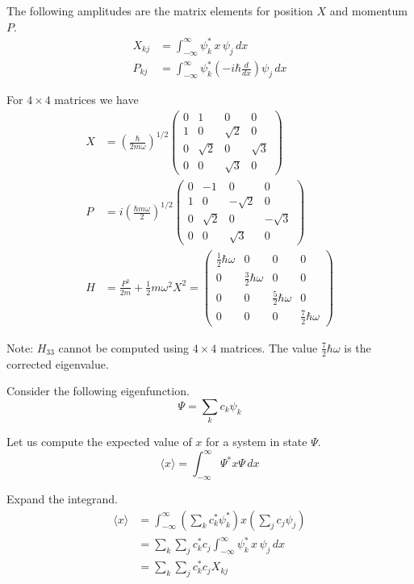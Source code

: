 \documentclass[12pt]{article}
\begin{document}
\noindent
The following amplitudes are the matrix elements for position $X$ and momentum $P$.
\begin{align*}
X_{kj}&=\int_{-\infty}^\infty \psi_k^*\,x\,\psi_j\,dx
\\[1ex]
P_{kj}&=\int_{-\infty}^\infty \psi_k^*\left(-i\hbar\frac{d}{dx}\right)\psi_j\,dx
\end{align*}

\noindent
For $4\times4$ matrices we have
\begin{align*}
X&=\left(\frac{\hbar}{2m\omega}\right)^{1/2}
\begin{pmatrix}
0 & 1 & 0 & 0
\\
1 & 0 & \sqrt{2} & 0
\\
0 & \sqrt{2} & 0 & \sqrt{3}
\\
0 & 0 & \sqrt{3} & 0
\end{pmatrix}
\\[1ex]
P&=i\left(\frac{\hbar m\omega}{2}\right)^{1/2}
\begin{pmatrix}
0 & -1 & 0 & 0
\\
1 & 0 & -\sqrt{2} & 0
\\
0 & \sqrt{2} & 0 & -\sqrt{3}
\\
0 & 0 & \sqrt{3} & 0
\end{pmatrix}
\\[1ex]
H&=\frac{P^2}{2m}+\frac{1}{2}m\omega^2 X^2
=\begin{pmatrix}
\tfrac{1}{2}\hbar\omega & 0 & 0 & 0
\\
0 & \tfrac{3}{2}\hbar\omega & 0 & 0
\\
0 & 0 & \tfrac{5}{2}\hbar\omega & 0
\\
0 & 0 & 0 & \tfrac{7}{2}\hbar\omega
\end{pmatrix}
\end{align*}

\noindent
Note: $H_{33}$ cannot be computed using $4\times4$ matrices.
The value $\tfrac{7}{2}\hbar\omega$ is the corrected eigenvalue.

\bigskip
\noindent
Consider the following eigenfunction.
\begin{equation*}
\Psi=\sum_k c_k\psi_k
\end{equation*}

\noindent
Let us compute the expected value of $x$ for a system in state $\Psi$.
\begin{equation*}
\langle x\rangle=\int_{-\infty}^\infty \Psi^* x\Psi\,dx
\end{equation*}

\noindent
Expand the integrand.
\begin{align*}
\langle x\rangle
&=\int_{-\infty}^\infty
\left(\sum_kc_k^*\psi_k^*\right) x \left(\sum_j c_j\psi_j\right)
\\
&=\sum_k\sum_jc_k^*c_j\int_{-\infty}^\infty\psi_k^*\,x\,\psi_j\,dx
\\
&=\sum_k\sum_jc_k^*c_j X_{kj}
\end{align*}
\end{document}
